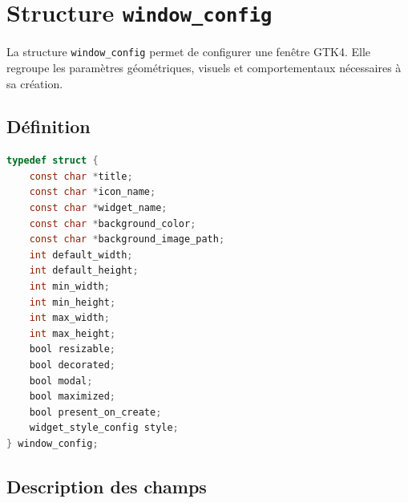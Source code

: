 \section{Structure \texttt{window\_config}}

La structure \texttt{window\_config} permet de configurer une fenêtre GTK4. Elle regroupe les paramètres géométriques, visuels et comportementaux nécessaires à sa création.

\subsection{Définition}

\begin{lstlisting}[language=C]
typedef struct {
    const char *title;
    const char *icon_name;
    const char *widget_name;
    const char *background_color;
    const char *background_image_path;
    int default_width;
    int default_height;
    int min_width;
    int min_height;
    int max_width;
    int max_height;
    bool resizable;
    bool decorated;
    bool modal;
    bool maximized;
    bool present_on_create;
    widget_style_config style;
} window_config;
\end{lstlisting}

\subsection{Description des champs}

